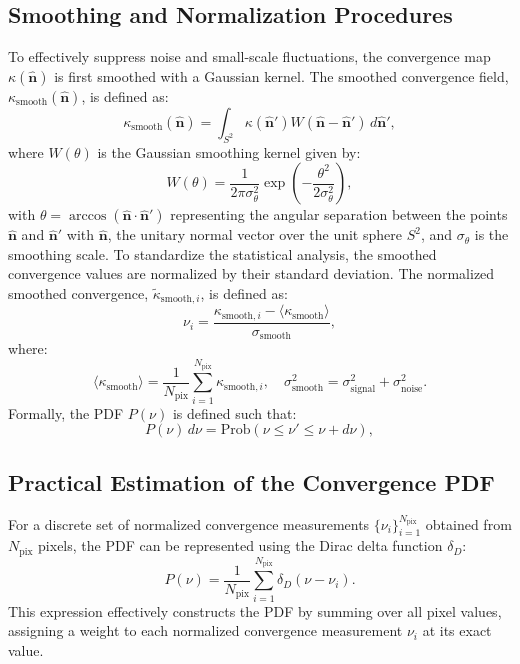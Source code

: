 \subsection{Smoothing and Normalization Procedures}
To effectively suppress noise and small-scale fluctuations, the convergence map $\kappa(\hat{\mathbf{n}})$ is first smoothed with a Gaussian kernel. The smoothed convergence field, $\kappa_{\mathrm{smooth}}(\hat{\mathbf{n}})$, is defined as:
\begin{equation}
    \kappa_{\mathrm{smooth}}(\hat{\mathbf{n}}) = \int_{S^2} \kappa(\hat{\mathbf{n}}') W(\hat{\mathbf{n}} - \hat{\mathbf{n}}') \, d\hat{\mathbf{n}}',
    \label{eq:smoothing}
\end{equation}
where $W(\theta)$ is the Gaussian smoothing kernel given by:
\begin{equation}
    W(\theta) = \frac{1}{2\pi \sigma_{\theta}^2} \exp\left( -\frac{\theta^2}{2 \sigma_{\theta}^2} \right),
    \label{eq:gaussian_kernel}
\end{equation}
with $\theta = \arccos(\hat{\mathbf{n}} \cdot \hat{\mathbf{n}}')$ representing the angular separation between the points $\hat{\mathbf{n}}$ and $\hat{\mathbf{n}}'$ with $\hat{\mathbf{n}}$, the unitary normal vector over the unit sphere $S^2$, and $\sigma_{\theta}$ is the smoothing scale. To standardize the statistical analysis, the smoothed convergence values are normalized by their standard deviation. The normalized smoothed convergence, $\tilde{\kappa}_{\mathrm{smooth}, i}$, is defined as:
\begin{equation}
    \nu_{i} = \frac{\kappa_{\mathrm{smooth}, i} - \langle \kappa_{\mathrm{smooth}} \rangle}{\sigma_{\mathrm{smooth}}},
    \label{eq:kappa_smooth_normalized}
\end{equation}
where:
\begin{equation}
    \langle \kappa_{\mathrm{smooth}} \rangle = \frac{1}{N_{\mathrm{pix}}} \sum_{i=1}^{N_{\mathrm{pix}}} \kappa_{\mathrm{smooth}, i}, \quad \sigma_{\mathrm{smooth}}^2 = \sigma_{\mathrm{signal}}^2 + \sigma_{\mathrm{noise}}^2.
    \label{eq:normalization}
\end{equation}
Formally, the PDF \( P(\nu) \) is defined such that:
\begin{equation}
    P(\nu) \, d\nu = \mathrm{Prob}(\nu \leq \nu' \leq \nu + d\nu),
\end{equation}

\subsection{Practical Estimation of the Convergence PDF}
For a discrete set of normalized convergence measurements \(\{\nu_i\}_{i=1}^{N_{\mathrm{pix}}}\) obtained from \(N_{\mathrm{pix}}\) pixels, the PDF can be represented using the Dirac delta function \(\delta_D\):
\begin{equation}
    P(\nu) = \frac{1}{N_{\mathrm{pix}}} \sum_{i=1}^{N_{\mathrm{pix}}} \delta_D(\nu - \nu_i).
    \label{eq:pdf_delta}
\end{equation}
This expression effectively constructs the PDF by summing over all pixel values, assigning a weight to each normalized convergence measurement \(\nu_i\) at its exact value.

